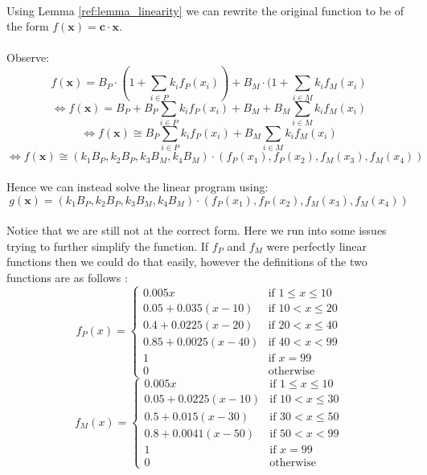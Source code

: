 \documentclass{article}
\begin{document}
\paragraph{}Using Lemma \ref{ref:lemma_linearity} we can rewrite the original function to be of the form $f(\boldsymbol{x})=\boldsymbol{c}\cdot \boldsymbol{x}$.
\paragraph{}Observe:
$$f(\boldsymbol{x}) = B_P\cdot (1 + \sum_{i \in P} k_i f_P(x_i)) + B_M \cdot (1 + \sum_{i \in M} k_i f_M(x_i)$$
$$\iff f(\boldsymbol{x}) = B_P + B_P \sum_{i \in P} k_i f_P(x_i) + B_M + B_M \sum_{i \in M} k_i f_M(x_i)$$
$$\iff f(\boldsymbol{x}) \cong B_P\sum_{i \in P} k_i f_P(x_i) + B_M\sum_{i \in M} k_i f_M(x_i)$$
$$\iff f(\boldsymbol{x}) \cong (k_1 B_P, k_2 B_P, k_3 B_M, k_4 B_M)\cdot (f_P (x_1), f_P(x_2), f_M(x_3), f_M(x_4))$$

\paragraph{}Hence we can instead solve the linear program using: 
\begin{equation}
    g(\boldsymbol{x})=(k_1 B_P, k_2 B_P, k_3 B_M, k_4 B_M)\cdot (f_P (x_1), f_P(x_2), f_M(x_3), f_M(x_4))
\end{equation}
\paragraph{}Notice that we are still not at the correct form. Here we run into some issues trying to further simplify the function. If $f_P$ and $f_M$ were perfectly linear functions then we could do that easily, however the definitions of the two functions are as follows \cite{dswiki-formula}:
\begin{equation}
f_{P}(x)=
    \begin{cases}
        0.005x & \text{if } 1 \leq x \leq 10 \\
        0.05 + 0.035(x-10) & \text{if } 10 < x \leq 20 \\
        0.4 + 0.0225(x-20) & \text{if } 20 < x \leq 40 \\
        0.85 + 0.0025(x-40) & \text{if } 40 < x < 99 \\
        1 & \text{if } x = 99 \\
        0 & \text{otherwise}
    \end{cases}
\end{equation}
\begin{equation}
f_{M}(x)=
    \begin{cases}
        0.005x & \text{if } 1 \leq x \leq 10 \\
        0.05 + 0.0225(x-10) & \text{if } 10 < x \leq 30 \\
        0.5 + 0.015(x-30) & \text{if } 30 < x \leq 50 \\
        0.8 + 0.0041(x-50) & \text{if } 50 < x < 99 \\
        1 & \text{if } x = 99 \\
        0 & \text{otherwise}
    \end{cases}
\end{equation}
\end{document}
